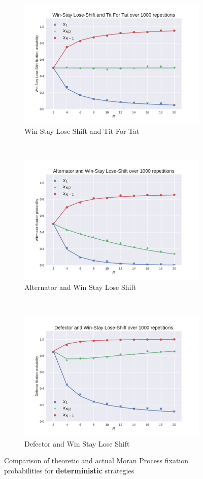 \documentclass{article}
\begin{document}
\begin{figure}[!hbtp]
    \begin{subfigure}[t]{.3\textwidth}
        \centering
        \includegraphics[width=.8\textwidth]{./img/Win-Stay_Lose-Shift_v_Tit_For_Tat.pdf}
        \caption{Win Stay Lose Shift and Tit For Tat}
    \end{subfigure}%
    ~
    \begin{subfigure}[t]{.3\textwidth}
        \centering
        \includegraphics[width=.8\textwidth]{./img/Alternator_v_Win-Stay_Lose-Shift.pdf}
        \caption{Alternator and Win Stay Lose Shift}
    \end{subfigure}%
    ~
    \begin{subfigure}[t]{.3\textwidth}
        \centering
        \includegraphics[width=.8\textwidth]{./img/Defector_v_Win-Stay_Lose-Shift.pdf}
        \caption{Defector and Win Stay Lose Shift}
    \end{subfigure}%
    \caption{Comparison of theoretic and actual Moran Process fixation
             probabilities for \textbf{deterministic} strategies}
    \label{fig:comparison_deterministic}
\end{figure}
\end{document}
